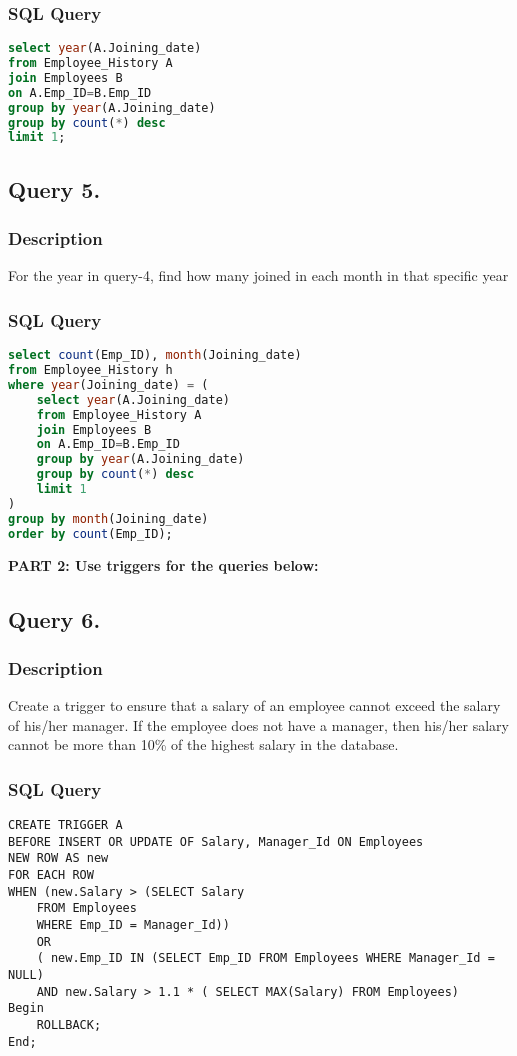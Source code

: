 \documentclass[a4paper]{article}
\begin{document}
\subsubsection{SQL Query}
\begin{lstlisting}[language=SQL]
select year(A.Joining_date)
from Employee_History A
join Employees B
on A.Emp_ID=B.Emp_ID
group by year(A.Joining_date)
group by count(*) desc
limit 1;
\end{lstlisting}

\newpage
\subsection{Query 5.}
\subsubsection{Description}
For the year in query-4, find how many joined in each month in that specific year
\subsubsection{SQL Query}
\begin{lstlisting}[language=SQL]
select count(Emp_ID), month(Joining_date)
from Employee_History h
where year(Joining_date) = (
	select year(A.Joining_date)
	from Employee_History A
	join Employees B
	on A.Emp_ID=B.Emp_ID
	group by year(A.Joining_date)
	group by count(*) desc
	limit 1
)
group by month(Joining_date)
order by count(Emp_ID);
\end{lstlisting}

\newpage
\textbf{PART 2: Use triggers for the queries below:}
\subsection{Query 6.}
\subsubsection{Description}
Create a trigger to ensure that a salary of an employee cannot exceed the salary of
his/her manager. If the employee does not have a manager, then his/her salary
cannot be more than 10\% of the highest salary in the database.
\subsubsection{SQL Query}
\begin{lstlisting}
CREATE TRIGGER A
BEFORE INSERT OR UPDATE OF Salary, Manager_Id ON Employees
NEW ROW AS new
FOR EACH ROW
WHEN (new.Salary > (SELECT Salary
    FROM Employees
    WHERE Emp_ID = Manager_Id))
    OR 
    ( new.Emp_ID IN (SELECT Emp_ID FROM Employees WHERE Manager_Id = NULL)
    AND new.Salary > 1.1 * ( SELECT MAX(Salary) FROM Employees)
Begin
    ROLLBACK;
End;
\end{lstlisting}
\end{document}
